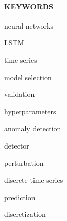 \paragraph{KEYWORDS}
\begin{itemize*}[label=,itemsep=4em,itemjoin=\hspace{2em}]
  \item neural networks
  \item LSTM
  \item time series
  \item model selection
  \item validation
  \item hyperparameters
  \item anomaly detection
  \item detector
  \item perturbation
  \item discrete time series
  \item prediction
  \item discretization
\end{itemize*}

\endinput
